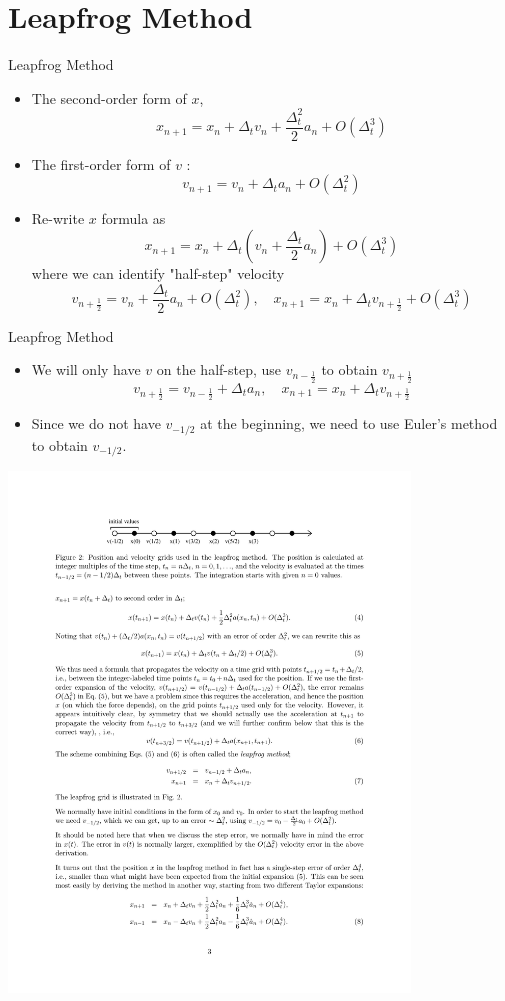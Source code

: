 \documentclass{beamer}
\begin{document}
\section{Leapfrog Method}
\begin{frame}{Leapfrog Method}
  \begin{itemize}
    \item The second-order form of $x$,
    $$
    x_{n+1}=x_n+\Delta_t v_n+\frac{\Delta_t^2}{2} a_n+O\left(\Delta_t^3\right)
    $$
\item The first-order form of ${v}$ :
    $$
    v_{n+1}=v_n+\Delta_t a_n+O\left(\Delta_t^2\right)
    $$
\item
    Re-write $x$ formula as
    $$
    x_{n+1}=x_n+\Delta_t\left(v_n+\frac{\Delta_t}{2}  a_n\right)+O\left(\Delta_t^3\right)
    $$
    where we can identify "half-step" velocity 
    \[
    v_{n+\frac{1}{2}} =v_n+\frac{\Delta_t}{2} a_n+O\left(\Delta_t^2\right),\quad
    x_{n+1} =x_n+\Delta_t v_{n+\frac{1}{2}}+O\left(\Delta_t^3\right)
  \]

  \end{itemize}
\end{frame}



\begin{frame}{Leapfrog Method}
  \begin{itemize}
  
  \item We will only have $v$ on the half-step, use $v_{n-\frac{1}{2}}$ to obtain $v_{n+\frac{1}{2}}$
  $$ 
     v_{n+\frac{1}{2}}  =v_{n-\frac{1}{2}}+\Delta_t a_n, \quad x_{n+1}  =x_n+\Delta_t v_{n+\frac{1}{2}}
  $$ 
  \item Since we do not have $v_{-1/2}$ at the beginning, we need to use Euler's method to obtain $v_{-1/2}$.
\end{itemize}

\centerline{\includegraphics[width=0.8\textwidth]{./leapfrog.pdf}}
\end{frame}
\end{document}
